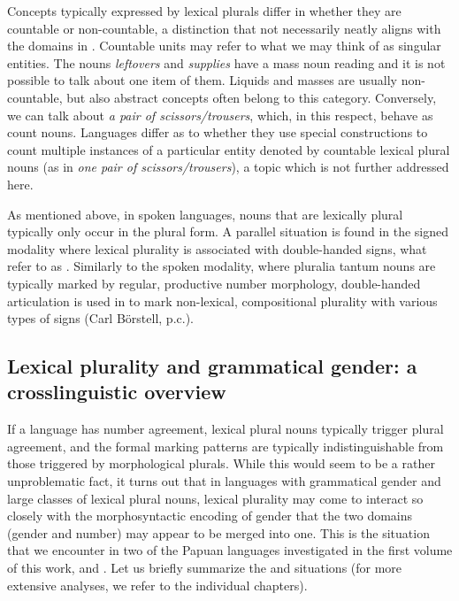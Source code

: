 \documentclass[output=collectionpaper]{langsci/langscibook}
\begin{document}
Concepts typically expressed by lexical plurals differ in whether they are countable or non-countable, a distinction that not necessarily neatly aligns with the domains in . Countable units may refer to what we may think of as singular entities. The  nouns \textit{leftovers} and \textit{supplies} have a mass noun reading and it is not possible to talk about one item of them. Liquids and masses are usually non-countable, but also abstract concepts often belong to this category. Conversely, we can talk about \textit{a pair of scissors/trousers}, which, in this respect, behave as count nouns. Languages differ as to whether they use special constructions to count multiple instances of a particular entity denoted by countable lexical plural nouns (as in  \textit{one pair of scissors/trousers}), a topic which is not further addressed here.

As mentioned above, in spoken languages, nouns that are lexically plural typically only occur in the plural form. A parallel situation is found in the signed modality where lexical plurality is associated with double-handed signs, what \cite{Boerstell2017} refer to as . Similarly to the spoken modality, where pluralia tantum nouns are typically marked by regular, productive number morphology, double-handed articulation is used in  to mark non-lexical, compositional plurality with various types of signs (Carl Börstell, p.c.).

\subsection{Lexical plurality and grammatical gender: a crosslinguistic overview}\label{sec:WDG:9.2}

If a language has number agreement, lexical plural nouns typically trigger plural agreement, and the formal marking patterns are typically indistinguishable from those triggered by morphological plurals. While this would seem to be a rather unproblematic fact, it turns out that in languages with grammatical gender and large classes of lexical plural nouns, lexical plurality may come to interact so closely with the morphosyntactic encoding of gender that the two domains (gender and number) may appear to be merged into one. This is the situation that we encounter in two of the Papuan languages investigated in the first volume of this work,  \citep{chapters/08} and  \citep{chapters/07}. Let us briefly summarize the  and  situations (for more extensive analyses, we refer to the individual chapters).
\end{document}
